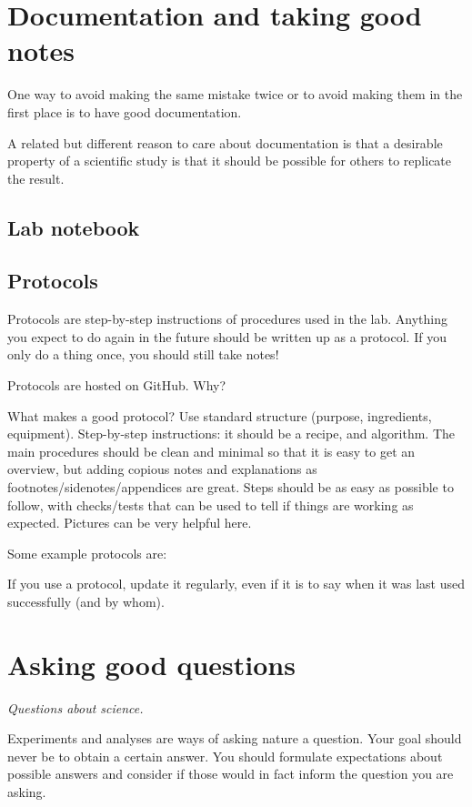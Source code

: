 \documentclass{tufte-book}
\begin{document}
\section{Documentation and taking good notes}

One way to avoid making the same mistake twice or to avoid making them
in the first place is to have good documentation.

A related but different reason to care about documentation is that a
desirable property of a scientific study is that it should be possible
for others to replicate the result.

\subsection{Lab notebook}

\subsection{Protocols}

Protocols are step-by-step instructions of procedures used in the
lab. Anything you expect to do again in the future should be written
up as a protocol. If you only do a thing once, you should still take
notes!

Protocols are hosted on GitHub. Why?

What makes a good protocol? Use standard structure (purpose,
ingredients, equipment). Step-by-step instructions: it should be a
recipe, and algorithm. The main procedures should be clean and minimal
so that it is easy to get an overview, but adding copious notes and
explanations as footnotes/sidenotes/appendices are great. Steps should
be as easy as possible to follow, with checks/tests that can be used
to tell if things are working as expected. Pictures can be very
helpful here.

Some example protocols are:

If you use a protocol, update it regularly, even if it is to say when
it was last used successfully (and by whom).


\section{Asking good questions}

{\it Questions about science.}

Experiments and analyses are ways of asking nature a question. Your
goal should never be to obtain a certain answer. You should formulate
expectations about possible answers and consider if those would in
fact inform the question you are asking.
\end{document}
